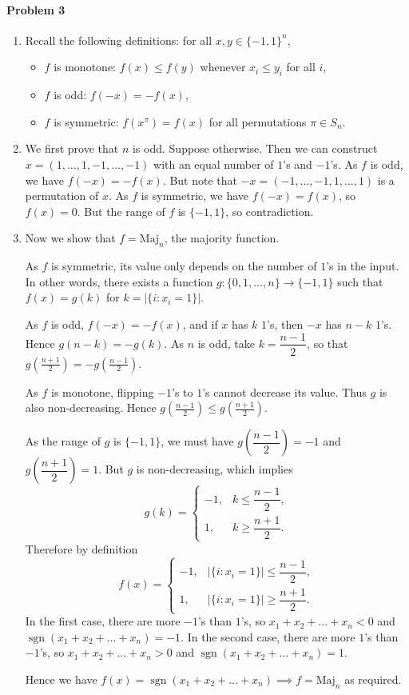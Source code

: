 \documentclass[12pt]{article}
\newcommand{\maj}{\mathrm{Maj}_n}
\DeclareMathOperator{\sgn}{sgn}
\begin{document}
\paragraph{Problem 3}
\begin{enumerate}[label=(\roman*)]
\item[] Recall the following definitions: for all $x, y\in\{-1,1\}^n$,
\begin{itemize}
\item $f$ is monotone: $f(x)\le f(y)$ whenever $x_i\le y_i$ for all $i$,
\item $f$ is odd: $f(-x)=-f(x)$,
\item $f$ is symmetric: $f\left(x^\pi\right)=f(x)$ for all permutations $\pi\in S_n$.
\end{itemize}
\item We first prove that $n$ is odd. Suppose otherwise. Then we can construct $x=(1,\dots,1,-1,\dots,-1)$ with an equal number of $1$'s and $-1$'s. As $f$ is odd, we have $f(-x)=-f(x)$. But note that $-x=(-1,\dots,-1,1,\dots,1)$ is a permutation of $x$. As $f$ is symmetric, we have $f(-x)=f(x)$, so $f(x)=0$. But the range of $f$ is $\{-1,1\}$, so contradiction.
\item Now we show that $f=\maj$, the majority function.

As $f$ is symmetric, its value only depends on the number of $1$'s in the input. In other words, there exists a function $g:\{0,1,\dots,n\}\to\{-1,1\}$ such that $f(x)=g(k)$ for $k=|\{i:x_i=1\}|$.

As $f$ is odd, $f(-x)=-f(x)$, and if $x$ has $k$ $1$'s, then $-x$ has $n-k$ $1$'s. Hence $g(n-k)=-g(k)$. As $n$ is odd, take $k=\dfrac{n-1}{2}$, so that $\displaystyle g\left(\frac{n+1}{2}\right)=-g\left(\frac{n-1}{2}\right)$.

As $f$ is monotone, flipping $-1$'s to $1$'s cannot decrease its value. Thus $g$ is also non-decreasing. Hence $\displaystyle g\left(\frac{n-1}{2}\right)\le g\left(\frac{n+1}{2}\right)$.

As the range of $g$ is $\{-1,1\}$, we must have $g\left(\dfrac{n-1}{2}\right)=-1$ and $g\left(\dfrac{n+1}{2}\right)=1$. But $g$ is non-decreasing, which implies
$$g(k)=\begin{cases}-1,&k\le\dfrac{n-1}{2},\\1,&k\ge\dfrac{n+1}{2}.\end{cases}$$
Therefore by definition
$$f(x)=\begin{cases}-1,&|\{i:x_i=1\}|\le\dfrac{n-1}{2},\\1,&|\{i:x_i=1\}|\ge\dfrac{n+1}{2}.\end{cases}$$
In the first case, there are more $-1$'s than $1$'s, so $x_1+x_2+\dots+x_n<0$ and $\sgn\left(x_1+x_2+\dots+x_n\right)=-1$. In the second case, there are more $1$'s than $-1$'s, so $x_1+x_2+\dots+x_n>0$ and $\sgn\left(x_1+x_2+\dots+x_n\right)=1$.

Hence we have $f(x)=\sgn\left(x_1+x_2+\dots+x_n\right)\implies f=\maj$ as required.
\end{enumerate}
\newpage
\end{document}
